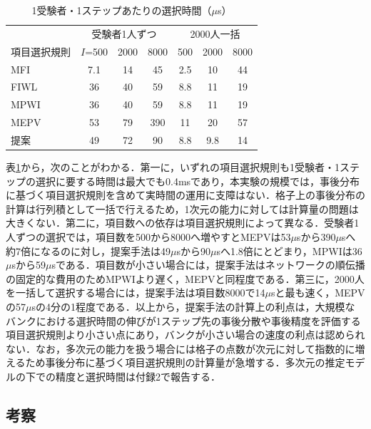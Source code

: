 \documentclass[paper]{ieicej}
\begin{document}
\begin{table}[t]
\centering
\caption{1受験者・1ステップあたりの選択時間（$\mu$s）}
\label{tab:cost}
\footnotesize
\begin{tabular}{lcccccc}
\hline
 & \multicolumn{3}{c}{受験者1人ずつ} & \multicolumn{3}{c}{2000人一括}\\
項目選択規則 & $I$=500 & 2000 & 8000 & 500 & 2000 & 8000\\
\hline
MFI & 7.1 & 14 & 45 & 2.5 & 10 & 44\\
FIWL & 36 & 40 & 59 & 8.8 & 11 & 19\\
MPWI & 36 & 40 & 59 & 8.8 & 11 & 19\\
MEPV & 53 & 79 & 390 & 11 & 20 & 57\\
提案 & 49 & 72 & 90 & 8.8 & 9.8 & 14\\
\hline
\end{tabular}
\end{table}

表\ref{tab:cost}から，次のことがわかる．第一に，いずれの項目選択規則も1受験者・1ステップの選択に要する時間は最大でも0.4msであり，本実験の規模では，事後分布に基づく項目選択規則を含めて実時間の運用に支障はない．格子上の事後分布の計算は行列積として一括で行えるため，1次元の能力に対しては計算量の問題は大きくない．第二に，項目数への依存は項目選択規則によって異なる．受験者1人ずつの選択では，項目数を500から8000へ増やすとMEPVは53$\mu$sから390$\mu$sへ約7倍になるのに対し，提案手法は49$\mu$sから90$\mu$sへ1.8倍にとどまり，MPWIは36$\mu$sから59$\mu$sである．項目数が小さい場合には，提案手法はネットワークの順伝播の固定的な費用のためMPWIより遅く，MEPVと同程度である．第三に，2000人を一括して選択する場合には，提案手法は項目数8000で14$\mu$sと最も速く，MEPVの57$\mu$sの4分の1程度である．以上から，提案手法の計算上の利点は，大規模なバンクにおける選択時間の伸びが1ステップ先の事後分散や事後精度を評価する項目選択規則より小さい点にあり，バンクが小さい場合の速度の利点は認められない．なお，多次元の能力を扱う場合には格子の点数が次元に対して指数的に増えるため事後分布に基づく項目選択規則の計算量が急増する．多次元の推定モデルの下での精度と選択時間は付録2で報告する．

\subsection{考察}\label{sec:discussion}
\end{document}
